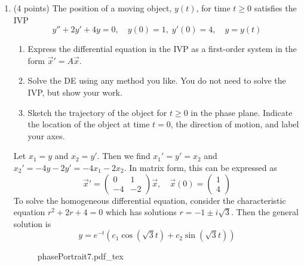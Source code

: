 \documentclass[11pt, titlepage]{article}
\begin{document}
\begin{enumerate}
        \item (4 points) The position of a moving object, $y(t)$, for time $t
            \geq 0$ satisfies the IVP
            \[
                y'' + 2y' + 4y = 0, \quad y(0) = 1, \; y'(0) = 4, \quad y = y(t)
            \] 
            \begin{enumerate}[label={(\alph*)}]
            \item Express the differential equation in the IVP as a first-order
                system in the form $\vec{x}' = A \vec{x}$.
            \item Solve the DE using any method you like. You do not need to
                solve the IVP, but show your work.
            \item Sketch the trajectory of the object for $t \geq 0$ in the
                phase plane. Indicate the location of the object at time $t =
                0$, the direction of motion, and label your axes.
            \end{enumerate}

            \begin{solution}
                Let $x_1 = y$ and $x_2 = y'$. Then we find $x_1' = y' = x_2$ and
                $x_2' = -4y - 2y' = -4x_1 - 2x_2$. In matrix form, this can be
                expressed as
                \[
                    \vec{x}' = 
                    \begin{pmatrix}
                        0 & 1 \\
                        -4 & -2
                    \end{pmatrix} \vec{x}, \quad \vec{x}(0) =
                    \begin{pmatrix}
                        1 \\
                        4
                    \end{pmatrix}
                \] 
                To solve the homogeneous differential equation, consider the
                characteristic equation $r^2 + 2r + 4 = 0$ which has solutions
                $r = -1 \pm i\sqrt{3}$. Then the general solution is
                \[
                    y = e^{-t} \left(c_1 \cos(\sqrt{3} t) + c_2 \sin(\sqrt{3} t)
                    \right)
                \] 

                \begin{figure}[h]
                    \centering
                    \def\svgwidth{0.7\columnwidth}
                    {phasePortrait7.pdf_tex}
                \end{figure}
            \end{solution}
        \pagebreak


\end{enumerate}
\end{document}
